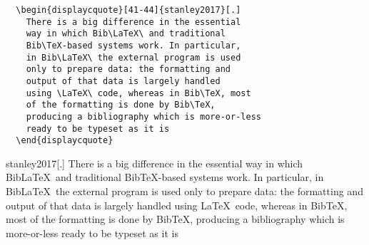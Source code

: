 \begin{center}
  \begin{minipage}{.4\linewidth}
\begin{verbatim}
  \begin{displaycquote}[41-44]{stanley2017}[.]
    There is a big difference in the essential 
    way in which Bib\LaTeX\ and traditional 
    Bib\TeX-based systems work. In particular,
    in Bib\LaTeX\ the external program is used 
    only to prepare data: the formatting and 
    output of that data is largely handled 
    using \LaTeX\ code, whereas in Bib\TeX, most 
    of the formatting is done by Bib\TeX, 
    producing a bibliography which is more-or-less 
    ready to be typeset as it is
  \end{displaycquote}
\end{verbatim}
\end{minipage}
\hfill
\begin{minipage}{.4\linewidth}
  \begin{displaycquote}[41-44]{stanley2017}[.]
    There is a big difference in the essential 
    way in which Bib\LaTeX\ and traditional 
    Bib\TeX-based systems work. In particular,
    in Bib\LaTeX\ the external program is used 
    only to prepare data: the formatting and 
    output of that data is largely handled 
    using \LaTeX\ code, whereas in Bib\TeX, most 
    of the formatting is done by Bib\TeX, 
    producing a bibliography which is more-or-less 
    ready to be typeset as it is
  \end{displaycquote}
\end{minipage}
\end{center}
